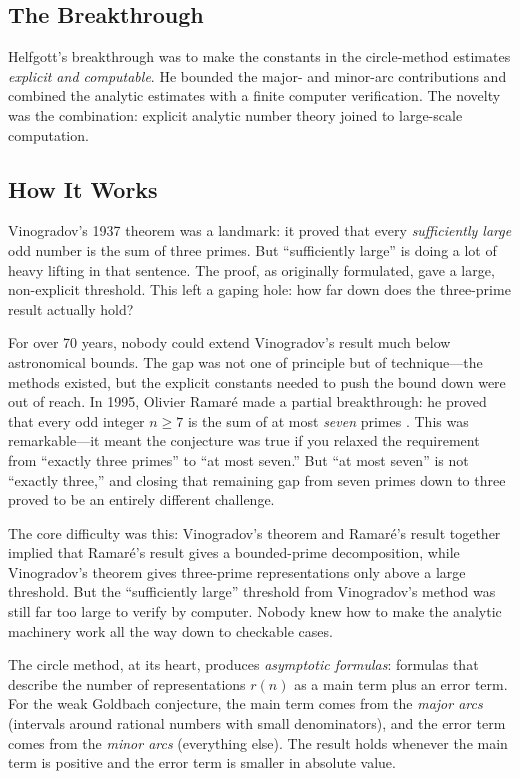 \subsection{The Breakthrough}
Helfgott's breakthrough was to make the constants in the circle-method estimates \emph{explicit and computable}. He bounded the major- and minor-arc contributions and combined the analytic estimates with a finite computer verification. The novelty was the combination: explicit analytic number theory joined to large-scale computation.

\subsection{How It Works}

Vinogradov's 1937 theorem was a landmark: it proved that every \emph{sufficiently large} odd number is the sum of three primes. But ``sufficiently large'' is doing a lot of heavy lifting in that sentence. The proof, as originally formulated, gave a large, non-explicit threshold. This left a gaping hole: how far down does the three-prime result actually hold?

For over 70 years, nobody could extend Vinogradov's result much below astronomical bounds. The gap was not one of principle but of technique---the methods existed, but the explicit constants needed to push the bound down were out of reach. In 1995, Olivier Ramar\'e made a partial breakthrough: he proved that every odd integer $n \geq 7$ is the sum of at most \emph{seven} primes \cite{ramare1995}. This was remarkable---it meant the conjecture was true if you relaxed the requirement from ``exactly three primes'' to ``at most seven.'' But ``at most seven'' is not ``exactly three,'' and closing that remaining gap from seven primes down to three proved to be an entirely different challenge.

The core difficulty was this: Vinogradov's theorem and Ramar\'e's result together implied that Ramaré's result gives a bounded-prime decomposition, while Vinogradov's theorem gives three-prime representations only above a large threshold. But the ``sufficiently large'' threshold from Vinogradov's method was still far too large to verify by computer. Nobody knew how to make the analytic machinery work all the way down to checkable cases.

The circle method, at its heart, produces \emph{asymptotic formulas}: formulas that describe the number of representations $r(n)$ as a main term plus an error term. For the weak Goldbach conjecture, the main term comes from the \emph{major arcs} (intervals around rational numbers with small denominators), and the error term comes from the \emph{minor arcs} (everything else). The result holds whenever the main term is positive and the error term is smaller in absolute value.

